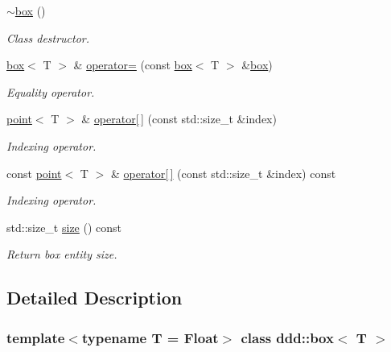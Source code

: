 \begin{DoxyCompactItemize}
\mbox{\label{classddd_1_1box_acf895c1a62aa6c53c4e9dc9f2b1b1df1}} 
\hyperlink{classddd_1_1box_acf895c1a62aa6c53c4e9dc9f2b1b1df1}{$\sim$box} ()
\begin{DoxyCompactList}\small\item\em Class destructor. \end{DoxyCompactList}\item 
\hyperlink{classddd_1_1box}{box}$<$ T $>$ \& \hyperlink{classddd_1_1box_a80ec0210ef2e3bcb0cd8e22e77f5c89d}{operator=} (const \hyperlink{classddd_1_1box}{box}$<$ T $>$ \&\hyperlink{classddd_1_1box}{box})
\begin{DoxyCompactList}\small\item\em Equality operator. \end{DoxyCompactList}\item 
\hyperlink{classddd_1_1point}{point}$<$ T $>$ \& \hyperlink{classddd_1_1box_a3fd2b2f0fbfcc484878a32f82994b294}{operator\mbox{[}$\,$\mbox{]}} (const std\+::size\+\_\+t \&index)
\begin{DoxyCompactList}\small\item\em Indexing operator. \end{DoxyCompactList}\item 
const \hyperlink{classddd_1_1point}{point}$<$ T $>$ \& \hyperlink{classddd_1_1box_af9045901479a5032acaf916009c4731d}{operator\mbox{[}$\,$\mbox{]}} (const std\+::size\+\_\+t \&index) const
\begin{DoxyCompactList}\small\item\em Indexing operator. \end{DoxyCompactList}\item 
\mbox{\label{classddd_1_1box_a450bee2733046d15d358546ae0606d66}} 
std\+::size\+\_\+t \hyperlink{classddd_1_1box_a450bee2733046d15d358546ae0606d66}{size} () const
\begin{DoxyCompactList}\small\item\em Return box entity size. \end{DoxyCompactList}\end{DoxyCompactItemize}


\subsection{Detailed Description}
\subsubsection*{template$<$typename T = Float$>$\newline
class ddd\+::box$<$ T $>$}


